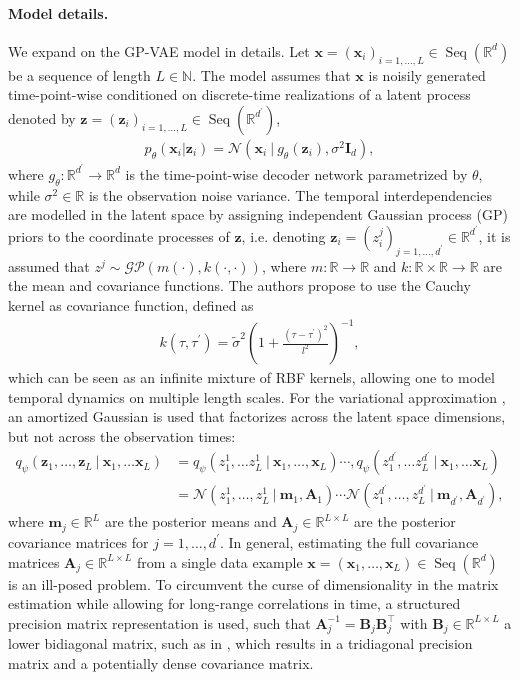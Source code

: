 \documentclass{article} \usepackage{iclr2021_conference,times}
\newcommand{\R}{\mathbb{R}}
\newcommand{\cN}{\mathcal{N}}
\newcommand{\bx}{\mathbf{x}}
\newcommand{\bz}{\mathbf{z}}
\newcommand{\NN}{\mathbb{N}}
\renewcommand\given[1][]{\:#1\vert\:}
\newcommand{\Seq}[1]{\operatorname{Seq}(#1)}
\theoremstyle{plain}
\theoremstyle{definition}
\begin{document}
\paragraph{Model details.} We expand on the GP-VAE \citep{fortuin2019gpvae} model in details. Let $\bx = (\bx_i)_{i=1,\dots,L} \in \Seq{\R^d}$ be a sequence of length $L \in \NN$. The model assumes that $\bx$ is noisily generated time-point-wise conditioned on discrete-time realizations of a latent process denoted by $\bz = (\bz_{i})_{i=1,\dots,L} \in \Seq{\R^{d^\prime}}$,
\begin{align}
p_\theta(\bx_i \vert \bz_i) = \cN(\bx_i \given g_\theta(\bz_i), \sigma^2 \mathbf{I}_d),
\end{align}
where $g_\theta: \R^{d^\prime} \rightarrow \R^d$ is the time-point-wise decoder network parametrized by $\theta$, while $\sigma^2 \in \R$ is the observation noise variance. The temporal interdependencies are modelled in the latent space by assigning independent Gaussian process (GP) priors \citep{williams2006gaussian} to the coordinate processes of $\bz$, i.e. denoting $\bz_i = (z_i^j)_{j=1,\dots,d^\prime} \in \R^{d^\prime}$, it is assumed that $z^j \sim \mathcal{GP}(m(\cdot), k(\cdot, \cdot))$, where $m: \R \rightarrow \R$ and $k: \R \times \R \rightarrow \R$ are the mean and covariance functions. The authors propose to use the Cauchy kernel as covariance function, defined as 
\begin{align}
    k(\tau, \tau^\prime) = \tilde\sigma^2 \left(1 + \frac{(\tau - \tau^\prime)^2}{l^2}\right)^{-1},
\end{align}
which can be seen as an infinite mixture of RBF kernels, allowing one to model temporal dynamics on multiple length scales. For the variational approximation \citep{blei2017variational, zhang2018advances}, an amortized Gaussian \citep{Gershman2014AmortizedII} is used that factorizes across the latent space dimensions, but not across the observation times:
\begin{align}
    q_\psi(\bz_1, \dots, \bz_L \given \bx_1, \dots \bx_L) &= q_\psi(z_1^1, \dots z_L^1 \given \bx_1, \dots, \bx_L) \cdots, q_\psi(z_1^{d^\prime}, \dots z_L^{d^\prime} \given \bx_1, \dots \bx_L) \\
    &= \cN(z_1^1, \dots, z_L^1 \given \mathbf{m}_1, \mathbf{A}_1) \cdots \cN(z_1^{d^\prime}, \dots, z_L^{d^\prime} \given \mathbf{m}_{d^\prime}, \mathbf{A}_{d^\prime}), 
\end{align}
where $\mathbf{m}_j \in \R^L$ are the posterior means and $\mathbf{A}_j \in \R^{L \times L}$ are the posterior covariance matrices for $j=1, \dots, d^\prime$. In general, estimating the full covariance matrices $\mathbf{A}_j \in \R^{L \times L}$ from a single data example $\bx = (\bx_1, \dots, \bx_L) \in \Seq{\R^d}$ is an ill-posed problem. To circumvent the curse of dimensionality in the matrix estimation while allowing for long-range correlations in time, a structured precision matrix representation is used, such that $\mathbf{A}_j^{-1} = \mathbf{B}_j \mathbf{B}_j^\top$ with $\mathbf{B}_j \in \R^{L \times L}$ a lower bidiagonal matrix, such as in \citet{dorta2018structured, blei2006dynamic, bamler2017dynamic}, which results in a tridiagonal precision matrix and a potentially dense covariance matrix.
\end{document}
